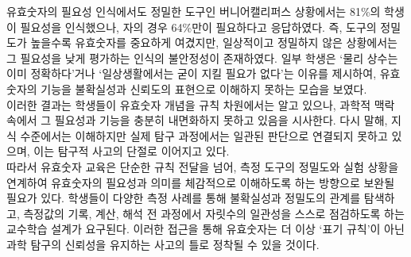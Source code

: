 유효숫자의 필요성 인식에서도 정밀한 도구인 버니어캘리퍼스 상황에서는 81\%의 학생이 필요성을 인식했으나,
자의 경우 64\%만이 필요하다고 응답하였다.
%
즉, 도구의 정밀도가 높을수록 유효숫자를 중요하게 여겼지만,
일상적이고 정밀하지 않은 상황에서는 그 필요성을 낮게 평가하는 인식의 불안정성이 존재하였다.
일부 학생은 `물리 상수는 이미 정확하다'거나
`일상생활에서는 굳이 지킬 필요가 없다'는 이유를 제시하여,
유효숫자의 기능을 불확실성과 신뢰도의 표현으로 이해하지 못하는 모습을 보였다. \\

이러한 결과는 학생들이 유효숫자 개념을 규칙 차원에서는 알고 있으나,
과학적 맥락 속에서 그 필요성과 기능을 충분히 내면화하지 못하고 있음을 시사한다.
%
다시 말해, 지식 수준에서는 이해하지만 실제 탐구 과정에서는 일관된 판단으로 연결되지 못하고 있으며,
이는 탐구적 사고의 단절로 이어지고 있다. \\

따라서 유효숫자 교육은 단순한 규칙 전달을 넘어,
측정 도구의 정밀도와 실험 상황을 연계하여 유효숫자의 필요성과 의미를
체감적으로 이해하도록 하는 방향으로 보완될 필요가 있다.
%
학생들이 다양한 측정 사례를 통해 불확실성과 정밀도의 관계를 탐색하고,
측정값의 기록, 계산, 해석 전 과정에서 자릿수의 일관성을 스스로 점검하도록 하는
교수학습 설계가 요구된다.
%
이러한 접근을 통해 유효숫자는 더 이상 `표기 규칙'이 아닌
과학 탐구의 신뢰성을 유지하는 사고의 틀로 정착될 수 있을 것이다.